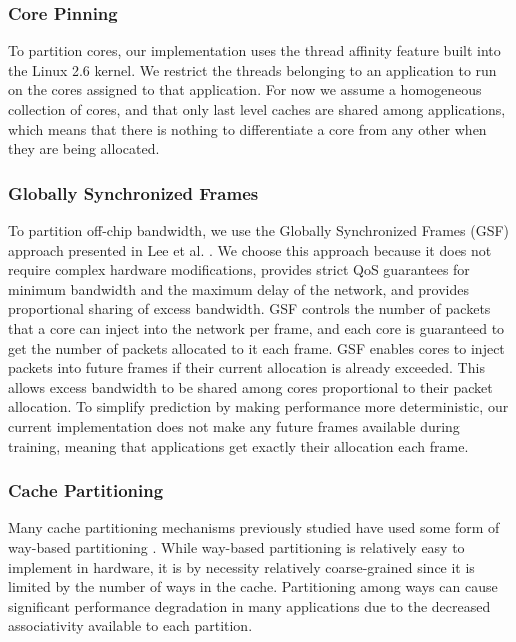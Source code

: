 
\subsubsection*{Core Pinning}
To partition cores, our implementation uses the thread affinity feature built into the Linux 2.6 kernel.  We restrict the threads belonging to an application to run on the cores assigned to that application.  For now we assume a homogeneous collection of cores, and that only last level caches are shared among applications, which means that there is nothing to differentiate a core from any other when they are being allocated.

\subsubsection*{Globally Synchronized Frames}
To partition off-chip bandwidth, we use the Globally Synchronized Frames (GSF) approach presented in Lee et al. \cite{gsf}.  We choose this approach because it does not require complex hardware modifications, provides strict QoS guarantees for minimum bandwidth and the maximum delay of the network, and provides proportional sharing of excess bandwidth.  GSF controls the number of packets that a core can inject into the network per frame, and each core is guaranteed to get the number of packets allocated to it each frame.  GSF enables cores to inject packets into future frames if their current allocation is already exceeded.  This allows excess bandwidth to be shared among cores proportional to their packet allocation.  To simplify prediction by making performance more deterministic, our current implementation does not make any future frames available during training, meaning that applications get exactly their allocation each frame.

\subsubsection*{Cache Partitioning}
Many cache partitioning mechanisms previously studied have used some form of way-based partitioning \cite{1331730,1152161,605420,1250671,1194855,1086328,1399982}.  While way-based partitioning is relatively easy to implement in hardware, it is by necessity relatively coarse-grained since it is limited by the number of ways in the cache.  Partitioning among ways can cause significant performance degradation in many applications due to the decreased associativity available to each partition.


